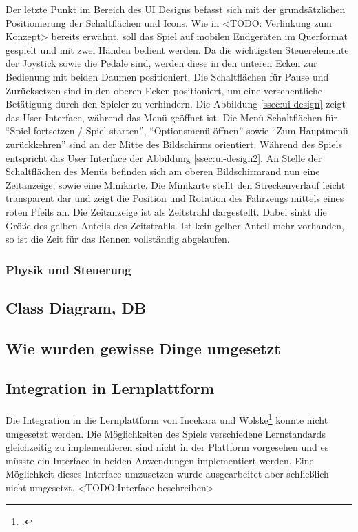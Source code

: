 	Der letzte Punkt im Bereich des UI Designs befasst sich mit der grundsätzlichen Positionierung der Schaltflächen und Icons. Wie in <TODO: Verlinkung zum Konzept> bereits erwähnt, soll das Spiel auf mobilen Endgeräten im Querformat gespielt und mit zwei Händen bedient werden. Da die wichtigsten Steuerelemente der Joystick sowie die Pedale sind, werden diese in den unteren Ecken zur Bedienung mit beiden Daumen positioniert. Die Schaltflächen für Pause und Zurücksetzen sind in den oberen Ecken positioniert, um eine versehentliche Betätigung durch den Spieler zu verhindern.
	Die Abbildung \ref{ssec:ui-design} zeigt das User Interface, während das Menü geöffnet ist. Die Menü-Schaltflächen für \enquote{Spiel fortsetzen / Spiel starten}, \enquote{Optionsmenü öffnen} sowie \enquote{Zum Hauptmenü zurückkehren} sind an der Mitte des Bildschirms orientiert.
	Während des Spiels entspricht das User Interface der Abbildung \ref{ssec:ui-design2}. An Stelle der Schaltflächen des Menüs befinden sich am oberen Bildschirmrand nun eine Zeitanzeige, sowie eine Minikarte. Die Minikarte stellt den Streckenverlauf leicht transparent dar und zeigt die Position und Rotation des Fahrzeugs mittels eines roten Pfeils an. Die Zeitanzeige ist als Zeitstrahl dargestellt. Dabei sinkt die Größe des gelben Anteils des Zeitstrahls. Ist kein gelber Anteil mehr vorhanden, so ist die Zeit für das Rennen vollständig abgelaufen.

	\subsubsection{Physik und Steuerung}
	\subsubsection{}

\subsection{Class Diagram, DB}
\subsection{Wie wurden gewisse Dinge umgesetzt}
\subsection{Integration in Lernplattform}
	Die Integration in die Lernplattform von Incekara und Wolske\footcite{lernplattform} konnte nicht umgesetzt werden. Die Möglichkeiten des Spiels verschiedene Lernstandards gleichzeitig zu implementieren sind nicht in der Plattform vorgesehen und es müsste ein Interface in beiden Anwendungen implementiert werden.
	Eine Möglichkeit dieses Interface umzusetzen wurde ausgearbeitet aber schließlich nicht umgesetzt.
	<TODO:Interface beschreiben>


